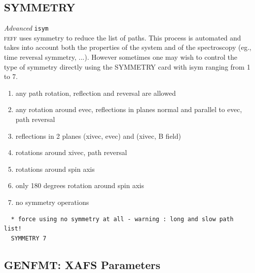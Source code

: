 \documentclass[11pt,oneside]{report} %
\newcommand{\program}[1]{\textsc{#1}}
\newcommand{\feff}{\program{feff}}
\newenvironment{Card}[4]%
      {\vspace{3ex}%
        \subsection{#1}
        \quad\textsl{#3}\newline
        \quad\texttt{#2}\newline%
        \label{card:#4}\\}
      {}
\begin{document}
\begin{Card}{SYMMETRY}{isym}{Advanced}{sym}
  {\feff} uses symmetry to reduce the list of paths.  This process is automated and takes into account
  both the properties of the system and of the spectroscopy (eg., time reversal symmetry, ...).  However
  sometimes one may wish to control the type of symmetry directly using the SYMMETRY card with isym ranging from 1 to 7.
  \begin{enumerate}
     \item  any path rotation, reflection and reversal are allowed
     \item  any rotation around evec, reflections in planes normal and parallel to evec, path reversal
     \item  reflections in 2 planes (xivec, evec) and (xivec, B field)
     \item  rotations around xivec, path reversal
     \item  rotations around spin axis
     \item  only 180 degrees rotation around spin axis
     \item  no symmetry operations
  \end{enumerate}
\begin{verbatim}
  * force using no symmetry at all - warning : long and slow path list!
  SYMMETRY 7
\end{verbatim}
\end{Card}



\subsection{GENFMT: XAFS Parameters}
\label{sec:Calc-contr-from}
\end{document}
